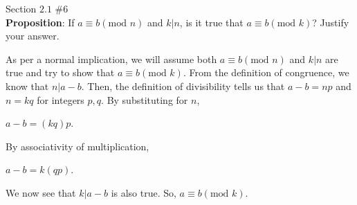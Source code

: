 \documentclass[12pt]{article}
\newenvironment{problem}[2][Problem]{\begin{trivlist}
\item[\hskip \labelsep {\bfseries #1}\hskip \labelsep {\bfseries #2.}]}{\end{trivlist}}
\begin{document}
\begin{problem}{3} Section $2.1$ $\#6$ \\

\noindent
\textbf{Proposition}: If $a \equiv b(\text{mod }n)$ and $k|n$, is it true that $a \equiv b(\text{mod }k)$? Justify your answer. 
\vspace{.3cm}

\noindent
As per a normal implication, we will assume both $a \equiv b(\text{mod }n)$ and $k|n$ are true and try to show that $a \equiv b(\text{mod }k)$. From the definition of congruence, we know that $n|a-b$. Then, the definition of divisibility tells us that $a-b=np$ and $n=kq$ for integers $p,q$. By substituting for $n$,
\begin{center}
$a-b=(kq)p$.
\end{center}
\noindent
By associativity of multiplication,
\begin{center}
$a-b=k(qp)$.
\end{center}
\noindent
We now see that $k|a-b$ is also true. So, $a \equiv b (\text{mod }k)$. \qedsymbol
\end{problem}
\end{document}
